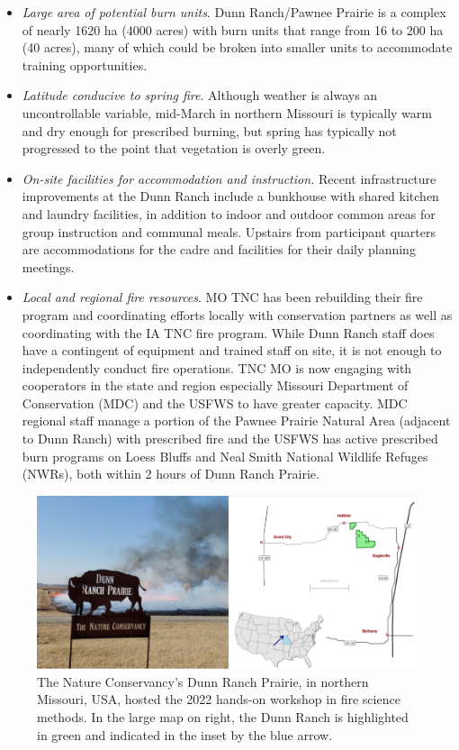 \documentclass[fire,article,submit,moreauthors,pdftex]{Definitions/mdpi}
\begin{document}
\begin{itemize}
\item
  \emph{Large area of potential burn units}. Dunn Ranch/Pawnee Prairie is a complex of nearly 1620 ha (4000 acres) with burn units that range from 16 to 200 ha (40 acres), many of which could be broken into smaller units to accommodate training opportunities.
\item
  \emph{Latitude conducive to spring fire}.
  Although weather is always an uncontrollable variable, mid-March in northern Missouri is typically warm and dry enough for prescribed burning, but spring has typically not progressed to the point that vegetation is overly green.
\item
  \emph{On-site facilities for accommodation and instruction.}
  Recent infrastructure improvements at the Dunn Ranch include a bunkhouse with shared kitchen and laundry facilities, in addition to indoor and outdoor common areas for group instruction and communal meals.
  Upstairs from participant quarters are accommodations for the cadre and facilities for their daily planning meetings.
\item
  \emph{Local and regional fire resources}.
  MO TNC has been rebuilding their fire program and coordinating efforts locally with conservation partners as well as coordinating with the IA TNC fire program. 
  While Dunn Ranch staff does have a contingent of equipment and trained staff on site, it is not enough to independently conduct fire operations.
  TNC MO is now engaging with cooperators in the state and region especially Missouri Department of Conservation (MDC) and the USFWS to have greater capacity.
  MDC regional staff manage a portion of the Pawnee Prairie Natural Area (adjacent to Dunn Ranch) with prescribed fire and the USFWS has active prescribed burn programs on Loess Bluffs and Neal Smith National Wildlife Refuges (NWRs), both within 2 hours of Dunn Ranch Prairie. 
  
\end{itemize}

\begin{figure}
\centering
\includegraphics[width=1\columnwidth]{DunnRanchMap.png}
\caption{The Nature Conservancy's Dunn Ranch Prairie, in northern Missouri, USA, hosted the 2022 hands-on workshop in fire science methods. In the large map on right, the Dunn Ranch is highlighted in green and indicated in the inset by the blue arrow.}
\label{DunnRanch}
\end{figure}
\end{document}
